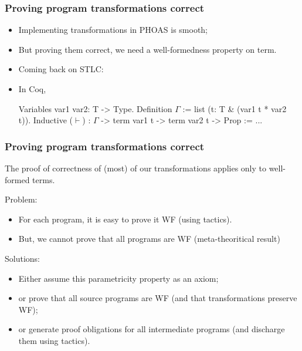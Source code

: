 \documentclass[9pt]{beamer}
\begin{document}
\begin{frame}[fragile]
  \frametitle{Proving program transformations correct}

\newcommand\lvar[1]{{\tt Var~#1}}
\newcommand\labs[1]{{\tt Abs~#1}}
\newcommand\lapp[2]{{\tt App~#1~#2}}

  \begin{itemize}
  \item Implementing transformations in PHOAS is smooth;
  \item But proving them correct, we need a well-formedness property
    on term.

  \item Coming back on STLC:


  \item In Coq,  
\begin{coq}
Variables var1 var2: T -> Type.
Definition $\Gamma$ := list ({t: T & (var1 t * var2 t)}). 
Inductive ($\vdash$) : $\Gamma$ -> term var1 t -> term var2 t -> Prop := ...
\end{coq}
  \end{itemize}
\end{frame}

\begin{frame}
  \frametitle{Proving program transformations correct}
  The proof of correctness of (most) of our transformations  applies only to well-formed terms.

  \alert{Problem}:
  \begin{itemize}
  \item For each program, it is easy to prove it WF (using tactics).
  \item But, we cannot prove that all programs are WF (meta-theoritical result)
  \end{itemize}

  \alert{Solutions}:
  \begin{itemize}
  \item Either assume this parametricity property as an axiom;
  \item or prove that all source programs are WF (and that transformations preserve WF);
  \item or generate proof obligations for all intermediate programs (and discharge them using tactics).
  \end{itemize}

\end{frame}
\end{document}
